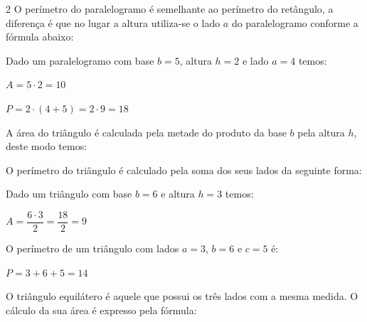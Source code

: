 \documentclass[12pt]{article}
\begin{document}
\begin{multicols}{2}
O perímetro do paralelogramo é semelhante ao perímetro do retângulo, a diferença é que no lugar a altura utiliza-se o lado $a$ do paralelogramo conforme a fórmula abaixo:



Dado um paralelogramo com base $b=5$, altura $h=2$ e lado $a=4$ temos:

$A = 5 \cdot 2 = 10$

$P = 2 \cdot (4+5) = 2 \cdot 9 = 18$


A área do triângulo é calculada pela metade do produto da base $b$ pela altura $h$, deste modo temos:


\vspace{-0.4cm}
\begin{center}
\end{center}

O perímetro do triângulo é calculado pela soma dos seus lados da seguinte forma:



Dado um triângulo com base $b=6$ e altura $h=3$ temos:

\vspace{8pt}
$A = \dfrac{6 \cdot 3}{2} = \dfrac{18}{2} = 9$ 
\vspace{8pt}

O perímetro de um triângulo com lados $a=3$, $b=6$ e $c=5$ é:

$P=3+6+5=14$


O triângulo equilátero é aquele que possui os três lados com a mesma medida. O cálculo da sua área é expresso pela fórmula:



\end{multicols}
\end{document}
